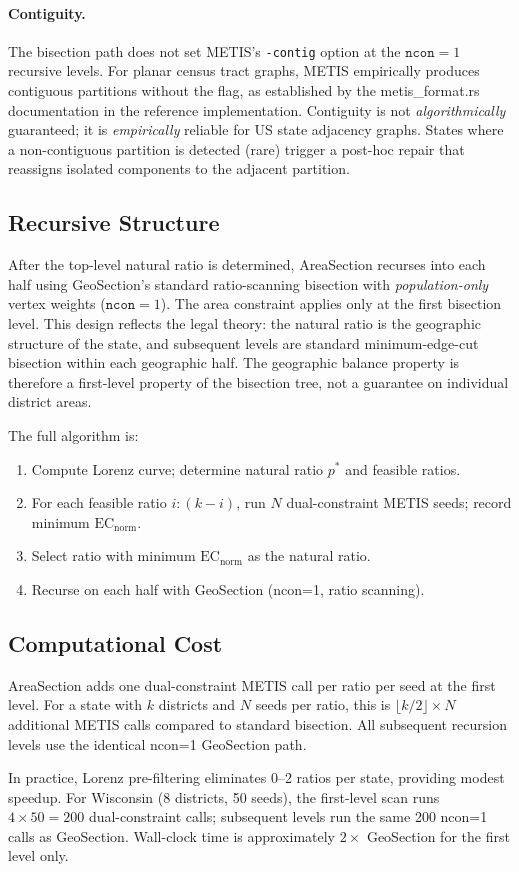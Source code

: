\paragraph{Contiguity.}
The bisection path does not set METIS's \texttt{-contig} option at the
$\mathtt{ncon}=1$ recursive levels.
For planar census tract graphs, METIS empirically produces contiguous partitions
without the flag, as established by the metis\_format.rs documentation in the
reference implementation.
Contiguity is not \emph{algorithmically} guaranteed; it is \emph{empirically}
reliable for US state adjacency graphs.
States where a non-contiguous partition is detected (rare) trigger a post-hoc
repair that reassigns isolated components to the adjacent partition.

\subsection{Recursive Structure}

After the top-level natural ratio is determined, AreaSection recurses into
each half using GeoSection's standard ratio-scanning bisection with
\emph{population-only} vertex weights ($\mathtt{ncon}=1$).
The area constraint applies only at the first bisection level.
This design reflects the legal theory: the natural ratio is the geographic
structure of the state, and subsequent levels are standard minimum-edge-cut
bisection within each geographic half.
The geographic balance property is therefore a first-level property of the
bisection tree, not a guarantee on individual district areas.

The full algorithm is:
\begin{enumerate}
  \item Compute Lorenz curve; determine natural ratio $p^*$ and feasible ratios.
  \item For each feasible ratio $i:(k-i)$, run $N$ dual-constraint METIS seeds;
    record minimum $\mathrm{EC}_{\text{norm}}$.
  \item Select ratio with minimum $\mathrm{EC}_{\text{norm}}$ as the natural ratio.
  \item Recurse on each half with GeoSection (ncon=1, ratio scanning).
\end{enumerate}

\subsection{Computational Cost}

AreaSection adds one dual-constraint METIS call per ratio per seed at the
first level.
For a state with $k$ districts and $N$ seeds per ratio, this is
$\lfloor k/2 \rfloor \times N$ additional METIS calls compared to standard
bisection.
All subsequent recursion levels use the identical ncon=1 GeoSection path.

In practice, Lorenz pre-filtering eliminates 0--2 ratios per state, providing
modest speedup.
For Wisconsin (8 districts, 50 seeds), the first-level scan runs
$4 \times 50 = 200$ dual-constraint calls; subsequent levels run the same
200 ncon=1 calls as GeoSection.
Wall-clock time is approximately $2\times$ GeoSection for the first level only.

